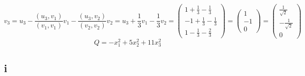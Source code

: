 $$ v_3 = u_3 - \frac{(u_3, v_1)}{(v_1, v_1)}v_1 - \frac{(u_3, v_2)}{(v_2, v_2)}v_2 = u_3 + \frac13v_1 - \frac13v_2 =
\begin{pmatrix}
	1 + \frac13 - \frac13 \\
    -1 + \frac13 - \frac13 \\
    1 - \frac13 - \frac23
\end{pmatrix} =
\begin{pmatrix}
	1 \\
    -1 \\
    0
\end{pmatrix} =
\begin{pmatrix}
    \frac1{\sqrt2} \\
    -\frac1{\sqrt2} \\
    0
\end{pmatrix} $$
$$ Q = -x_1^2 + 5x_2^2 + 11x_3^2 $$

\subsection{i}

